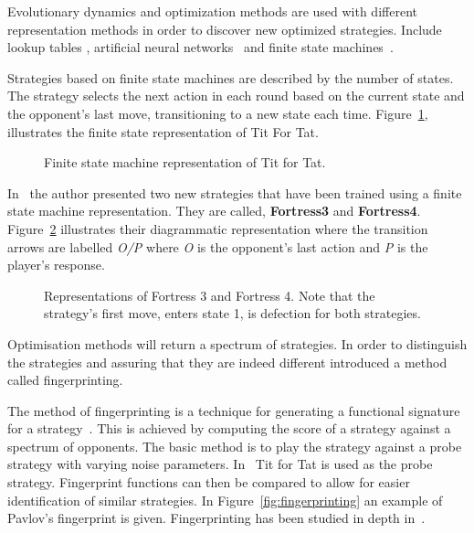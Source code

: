 \documentclass{article}
\begin{document}
Evolutionary dynamics and optimization methods are used with different representation
methods in order to discover new optimized strategies. Include lookup tables
\cite{Axelrod1987, Lindgren1994}, artificial neural networks~\cite{Fogel1996,
Lee2015} and finite state machines~\cite{Miller1996, Rubinstein1986}.

Strategies based on finite state machines are described by the number of states.
The strategy selects the next action in each round based on the current state
and the opponent's last move, transitioning to a new state each time. Figure~\ref{fig:tit_for_tat_fsm},
illustrates the finite state representation of Tit For Tat.

\begin{figure}[!hbtp]
    \centering
    
    \caption{Finite state machine representation of Tit for Tat.}
    \label{fig:tit_for_tat_fsm}
\end{figure}

In~\cite{Ashlock2006b} the author presented two new strategies that have
been trained using a finite state machine representation. They are called,
\textbf{Fortress3} and \textbf{Fortress4}. Figure~\ref{fig:fortress3_and_4}
illustrates their diagrammatic representation where the transition arrows are 
labelled \textit{O/P} where \textit{O} is the opponent's last action and \textit{P}
is the player's response.

\begin{figure}[!hbtp]
\centering
    \begin{subfigure}{.4\textwidth}
        
    \end{subfigure}
    \begin{subfigure}{.4\textwidth}\centering
        
     \end{subfigure}
     \caption{Representations of Fortress 3 and Fortress 4. Note that the
     strategy's first move, enters state 1, is defection for both strategies.}
     \label{fig:fortress3_and_4}
\end{figure}

Optimisation methods will return a spectrum of strategies. In order to distinguish
the strategies and assuring that they are indeed different \cite{Ashlock2005} 
introduced a method called fingerprinting. 

The method of fingerprinting is a technique for generating a functional signature for a 
strategy~\cite{Ashlock2008}. This is achieved by computing the score of a strategy
against a spectrum of opponents. The basic method is to play the strategy
against a probe strategy with varying noise parameters. In~\cite{Ashlock2005} 
Tit for Tat is used as the probe strategy. Fingerprint functions
can then be compared to allow for easier identification of similar strategies.
In Figure~\ref{fig:fingerprinting} an example of Pavlov's fingerprint is given.
Fingerprinting has been studied in depth in~\cite{Ashlock2008, Ashlock2009, 
Ashlock2010, Ashlock2006a}.
\end{document}

